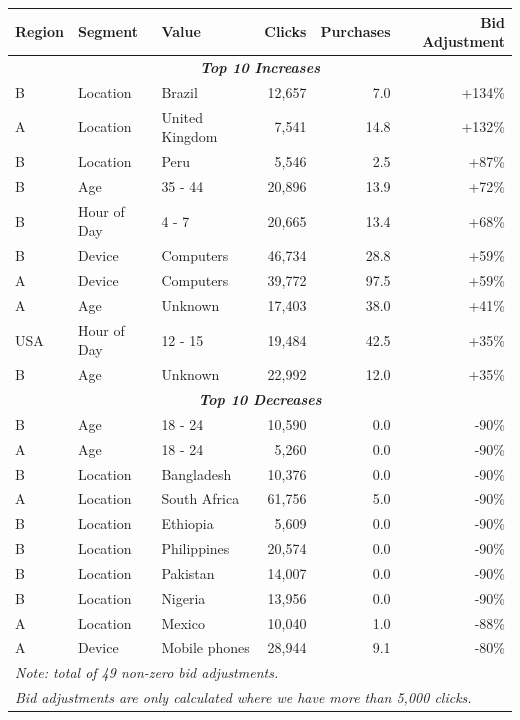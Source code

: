 \begin{table}[h!]
\centering
\tiny %
\begin{tabular}{lllrrr}
\toprule
\textbf{Region} & \textbf{Segment} & \textbf{Value} & \textbf{Clicks} & \textbf{Purchases} & \textbf{Bid Adjustment} \\
\midrule
\multicolumn{6}{c}{\textit{\textbf{Top 10 Increases}}} \\
\midrule
B & Location & Brazil & 12,657 & 7.0 & +134\% \\
A & Location & United Kingdom & 7,541 & 14.8 & +132\% \\
B & Location & Peru & 5,546 & 2.5 & +87\% \\
B & Age & 35 - 44 & 20,896 & 13.9 & +72\% \\
B & Hour of Day & 4 - 7 & 20,665 & 13.4 & +68\% \\
B & Device & Computers & 46,734 & 28.8 & +59\% \\
A & Device & Computers & 39,772 & 97.5 & +59\% \\
A & Age & Unknown & 17,403 & 38.0 & +41\% \\
USA & Hour of Day & 12 - 15 & 19,484 & 42.5 & +35\% \\
B & Age & Unknown & 22,992 & 12.0 & +35\% \\
\midrule
\multicolumn{6}{c}{\textit{\textbf{Top 10 Decreases}}} \\
\midrule
B & Age & 18 - 24 & 10,590 & 0.0 & -90\% \\
A & Age & 18 - 24 & 5,260 & 0.0 & -90\% \\
B & Location & Bangladesh & 10,376 & 0.0 & -90\% \\
A & Location & South Africa & 61,756 & 5.0 & -90\% \\
B & Location & Ethiopia & 5,609 & 0.0 & -90\% \\
B & Location & Philippines & 20,574 & 0.0 & -90\% \\
B & Location & Pakistan & 14,007 & 0.0 & -90\% \\
B & Location & Nigeria & 13,956 & 0.0 & -90\% \\
A & Location & Mexico & 10,040 & 1.0 & -88\% \\
A & Device & Mobile phones & 28,944 & 9.1 & -80\% \\
\bottomrule
\multicolumn{6}{l}{\textit{Note: total of 49 non-zero bid adjustments.}} \\
\multicolumn{6}{l}{\textit{Bid adjustments are only calculated where we have more than 5,000 clicks.}} \\
\end{tabular}
\end{table}